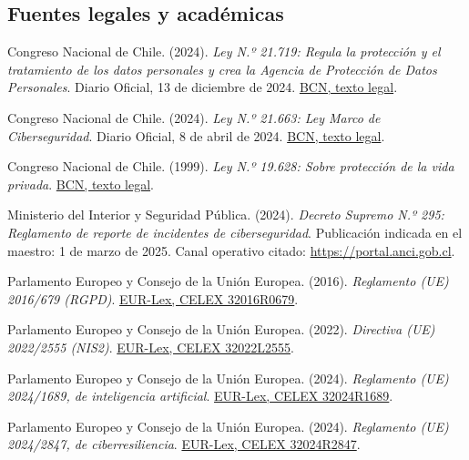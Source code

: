 
\subsection{Fuentes legales y académicas}
\begin{enumerate}[label={[\arabic*]},leftmargin=2em,itemsep=4pt]
\item Congreso Nacional de Chile. (2024). \textit{Ley N.º 21.719: Regula la protección y el tratamiento de los datos personales y crea la Agencia de Protección de Datos Personales}. Diario Oficial, 13 de diciembre de 2024. \href{https://www.bcn.cl/leychile/navegar?i=1209272}{BCN, texto legal}.
\item Congreso Nacional de Chile. (2024). \textit{Ley N.º 21.663: Ley Marco de Ciberseguridad}. Diario Oficial, 8 de abril de 2024. \href{https://www.bcn.cl/leychile/navegar?idNorma=1202434}{BCN, texto legal}.
\item Congreso Nacional de Chile. (1999). \textit{Ley N.º 19.628: Sobre protección de la vida privada}. \href{https://www.bcn.cl/leychile/navegar?idNorma=141599}{BCN, texto legal}.
\item Ministerio del Interior y Seguridad Pública. (2024). \textit{Decreto Supremo N.º 295: Reglamento de reporte de incidentes de ciberseguridad}. Publicación indicada en el maestro: 1 de marzo de 2025. Canal operativo citado: \url{https://portal.anci.gob.cl}.
\item Parlamento Europeo y Consejo de la Unión Europea. (2016). \textit{Reglamento (UE) 2016/679 (RGPD)}. \href{https://eur-lex.europa.eu/legal-content/ES/TXT/?uri=CELEX:32016R0679}{EUR-Lex, CELEX 32016R0679}.
\item Parlamento Europeo y Consejo de la Unión Europea. (2022). \textit{Directiva (UE) 2022/2555 (NIS2)}. \href{https://eur-lex.europa.eu/legal-content/ES/TXT/?uri=CELEX:32022L2555}{EUR-Lex, CELEX 32022L2555}.
\item Parlamento Europeo y Consejo de la Unión Europea. (2024). \textit{Reglamento (UE) 2024/1689, de inteligencia artificial}. \href{https://eur-lex.europa.eu/legal-content/ES/TXT/?uri=CELEX:32024R1689}{EUR-Lex, CELEX 32024R1689}.
\item Parlamento Europeo y Consejo de la Unión Europea. (2024). \textit{Reglamento (UE) 2024/2847, de ciberresiliencia}. \href{https://eur-lex.europa.eu/legal-content/ES/TXT/?uri=CELEX:32024R2847}{EUR-Lex, CELEX 32024R2847}.

\end{enumerate}
